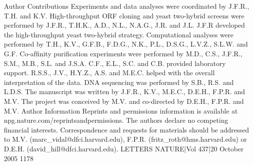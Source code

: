 Author Contributions Experiments and data analyses were coordinated by J.F.R.,
T.H. and K.V. High-throughput ORF cloning and yeast two-hybrid screens were
performed by J.F.R., T.H.K., A.D., N.L., N.A.G., J.R. and J.L. J.F.R developed the
high-throughput yeast two-hybrid strategy. Computational analyses were
performed by T.H., K.V., G.F.B., F.D.G., N.K., P.L., D.S.G., L.V.Z., S.L.W. and G.F.
Co-afﬁnity puriﬁcation experiments were performed by M.D., C.S., J.F.R., S.M.,
M.B., S.L. and J.S.A. C.F., E.L., S.C. and C.B. provided laboratory support. R.S.S.,
J.V., H.Y.Z., A.S. and M.E.C. helped with the overall interpretation of the data.
DNA sequencing was performed by S.B., R.S. and L.D.S. The manuscript was
written by J.F.R., K.V., M.E.C., D.E.H., F.P.R. and M.V. The project was conceived
by M.V. and co-directed by D.E.H., F.P.R. and M.V.
Author Information Reprints and permissions information is available at
npg.nature.com/reprintsandpermissions. The authors declare no competing
ﬁnancial interests. Correspondence and requests for materials should be
addressed to M.V. (marc\_vidal@dfci.harvard.edu), F.P.R.
(fritz\_roth@hms.harvard.edu) or D.E.H. (david\_hill@dfci.harvard.edu).
LETTERS
NATURE|Vol 437|20 October 2005
1178

